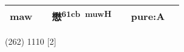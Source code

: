 \documentclass[14pt,a4paper]{scrartcl}
\begin{document}
\begin{longtable}[c]{@{}llllll@{}}
\begin{minipage}[t]{0.14\columnwidth}\raggedright\strut
maw
\strut\end{minipage} &
\begin{minipage}[t]{0.14\columnwidth}\raggedright\strut
\strut\end{minipage} &
\begin{minipage}[t]{0.14\columnwidth}\raggedright\strut
懋\textsuperscript{61cb~muwH}
\strut\end{minipage} &
\begin{minipage}[t]{0.14\columnwidth}\raggedright\strut
\strut\end{minipage} &
\begin{minipage}[t]{0.14\columnwidth}\raggedright\strut
pure:A
\strut\end{minipage}\tabularnewline
\bottomrule
\end{longtable}

(262) 1110 {[}2{]}
\end{document}
